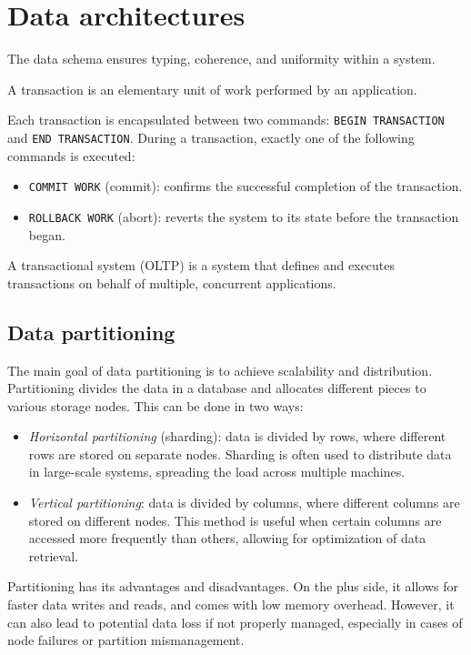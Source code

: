 \section{Data architectures}

The data schema ensures typing, coherence, and uniformity within a system.
\begin{definition}
    A transaction is an elementary unit of work performed by an application.
\end{definition}
Each transaction is encapsulated between two commands: \texttt{BEGIN TRANSACTION} and \texttt{END TRANSACTION}. 
During a transaction, exactly one of the following commands is executed:
\begin{itemize}
    \item \texttt{COMMIT WORK} (commit): confirms the successful completion of the transaction.
    \item \texttt{ROLLBACK WORK} (abort): reverts the system to its state before the transaction began.
\end{itemize}

\begin{definition}
    A transactional system (OLTP) is a system that defines and executes transactions on behalf of multiple, concurrent applications.
\end{definition}

\subsection{Data partitioning}
The main goal of data partitioning is to achieve scalability and distribution. 
Partitioning divides the data in a database and allocates different pieces to various storage nodes. 
This can be done in two ways:
\begin{itemize}
    \item \textit{Horizontal partitioning} (sharding): data is divided by rows, where different rows are stored on separate nodes. 
        Sharding is often used to distribute data in large-scale systems, spreading the load across multiple machines.
    \item \textit{Vertical partitioning}: data is divided by columns, where different columns are stored on different nodes. 
        This method is useful when certain columns are accessed more frequently than others, allowing for optimization of data retrieval.
\end{itemize}
Partitioning has its advantages and disadvantages. 
On the plus side, it allows for faster data writes and reads, and comes with low memory overhead. 
However, it can also lead to potential data loss if not properly managed, especially in cases of node failures or partition mismanagement.

